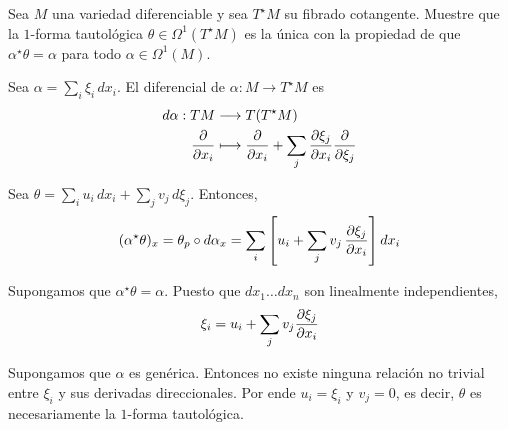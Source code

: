 \begin{problem}
Sea $M$ una variedad diferenciable y sea $T^\star M$ su fibrado cotangente. Muestre que la $1$-forma tautológica $\theta \in \Omega^1(T^\star M)$ es la única con la propiedad de que $\alpha^\star \theta = \alpha$ para todo $\alpha \in \Omega^1(M)$.
\end{problem}

\begin{solution}
Sea $\alpha = \sum_i \xi_i \, dx_i$. El diferencial de $\alpha : M \to T^\star M$ es
\begin{align*}
    d\alpha : TM & \longrightarrow T(T^\star M) \\
    \frac {\partial } {\partial x_i}  & \longmapsto     \frac {\partial } {\partial x_i} + \sum_j \frac {\partial \xi_j} {\partial x_i} \frac {\partial } {\partial \xi_j}
\end{align*}

Sea $\theta = \sum_i u_i \, dx_i + \sum_j v_j \, d\xi_j$. Entonces,
$$(\alpha^\star \theta)_x = \theta_p \circ d\alpha_x = \sum_i \left[ u_i + \sum_j v_j \, \frac {\partial \xi_j} {\partial x_i} \right] dx_i$$

Supongamos que $\alpha^\star \theta = \alpha$. Puesto que $dx_1 \dots dx_n$ son linealmente independientes,
$$\xi_i = u_i + \sum_j v_j \frac {\partial \xi_j} {\partial x_i}$$

Supongamos que $\alpha$ es genérica. Entonces no existe ninguna relación no trivial entre $\xi_i$ y sus derivadas direccionales. Por ende $u_i = \xi_i$ y $v_j = 0$, es decir, $\theta$ es necesariamente la $1$-forma tautológica.
\end{solution}

